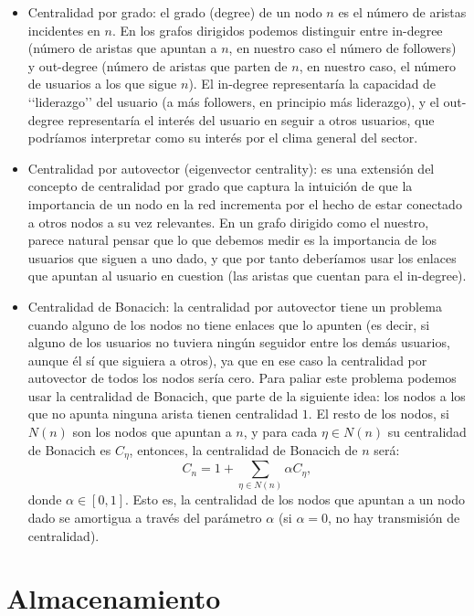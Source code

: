 \begin{itemize}
\item Centralidad por grado: el grado (degree) de un nodo $n$ es el número de aristas 
incidentes en $n$. En los grafos dirigidos podemos distinguir entre in-degree (número
de aristas que apuntan a $n$, en nuestro caso el número de followers) y
out-degree (número de aristas que parten de $n$, en nuestro caso, el número de
usuarios a los que sigue $n$). El in-degree representaría la capacidad de 
\lq\lq liderazgo\rq\rq
del usuario (a más followers, en principio más liderazgo), y el out-degree 
representaría el interés del usuario en seguir a otros usuarios, que podríamos
interpretar como su interés por el clima general del sector.
\item Centralidad por autovector (eigenvector centrality): es una extensión del 
concepto de centralidad por grado que captura la intuición de que la importancia 
de un nodo en la red incrementa por el hecho de estar conectado a otros nodos 
a su vez relevantes. En un grafo dirigido como el nuestro, parece natural pensar que
lo que debemos medir es la importancia de los usuarios que siguen a uno dado,
y que por tanto deberíamos usar los enlaces que apuntan al usuario en cuestion (las 
aristas que cuentan para el in-degree).
\item Centralidad de Bonacich: la centralidad por autovector tiene un problema cuando
alguno de los nodos no tiene enlaces que lo apunten (es decir, si alguno de los usuarios
no tuviera ningún seguidor entre los demás usuarios, aunque él sí que siguiera a otros),
ya que en ese caso la centralidad por autovector de todos los nodos sería cero. Para
paliar este problema podemos usar la centralidad de Bonacich, que  parte de la siguiente
idea: los nodos a los que no apunta ninguna arista tienen centralidad $1$. El resto
de los nodos, si $N(n)$ son los nodos que apuntan a $n$, y para cada $\eta\in N(n)$
su centralidad de Bonacich es $C_\eta$, entonces, la centralidad de Bonacich de $n$
será:
$$C_n = 1 + \sum_{\eta\in N(n)}\alpha C_\eta,$$
donde $\alpha\in[0,1]$. Esto es, la centralidad de los nodos que apuntan a un nodo
dado se amortigua a través del parámetro $\alpha$ (si $\alpha=0$, no hay transmisión
de centralidad).
\end{itemize}


\section{Almacenamiento}